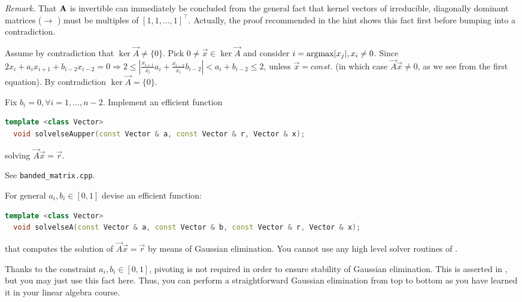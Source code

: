 \begin{problem}
\begin{subproblem}[4]
\emph{Remark.} That ${\mathbf{A}}$ is invertible can immediately be concluded from the
general fact that kernel vectors of irreducible, diagonally dominant matrices ($\to$
) must be multiples of $\left[1,1,\ldots,1\right]^{\top}$. Actually, the
proof recommended in the hint shows this fact first before bumping into a contradiction.

 \begin{solution}
 Assume by contradiction that $\ker \vec{A} \neq \{0\}$. Pick $0 \neq \vec{x} \in \ker \vec{A}$ and consider $i = \operatorname*{argmax} \lvert x_j \rvert, x_i \neq 0$.
 Since $2 x_i + a_{i} x_{i+1} + b_{i-2} x_{i-2} = 0 \Rightarrow 2 \leq |
 \frac{x_{i+1}}{x_i} a_{i} + \frac{x_{i-2}}{x_i} b_{i-2}| < a_{i} +  b_{i-2}
 \leq 2$, unless $\vec{x} = const.$ (in which case $\vec{A}\vec{x} \neq 0$, as we
 see from the first equation). By contradiction $\ker \vec{A} = \{0\}$.
 \end{solution}
\end{subproblem}

\begin{subproblem}[3]
 Fix $b_i = 0, \forall i = 1, \dots, n-2$. Implement an efficient \Cpp{} function 
 \begin{lstlisting}[language=c++]
  template <class Vector>
  void solvelseAupper(const Vector & a, const Vector & r, Vector & x);
 \end{lstlisting}
 solving $\vec{A} \vec{x} = \vec{r}$.
 
 \begin{solution}
  See \texttt{banded\_matrix.cpp}.
 \end{solution}
\end{subproblem}

\begin{subproblem}[3] \label{subrb:implement_solvelseAupper}
For general $a_i, b_i \in [0,1]$ devise an efficient \Cpp{} function:
 \begin{lstlisting}[language=c++]
  template <class Vector>
  void solvelseA(const Vector & a, const Vector & b, const Vector & r, Vector & x);
 \end{lstlisting}
 that computes the solution of $\vec{A} \vec{x} = \vec{r}$ by means of Gaussian elimination. You cannot use any high level solver routines of \Eigen.
 
 \begin{hint}
   Thanks to the constraint $a_i, b_i \in [0,1]$, pivoting is not required in
   order to ensure stability of Gaussian elimination. This is asserted in
   , but you may just use this fact here. Thus, you
   can perform a straightforward Gaussian elimination from top to bottom
   as you have learned it in your linear algebra course. 
 \end{hint}


\end{subproblem}
\end{problem}
